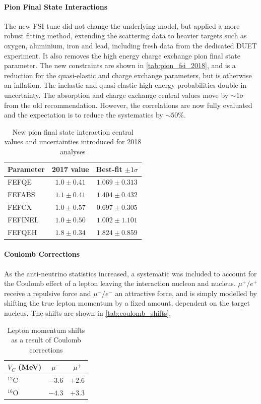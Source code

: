 \paragraph{Pion Final State Interactions}
The new FSI tune\cite{thesis_elder} did not change the underlying model, but applied a more robust fitting method, extending the scattering data to heavier targets such as oxygen, aluminium, iron and lead, including fresh data from the dedicated DUET experiment\cite{duet}. It also removes the high energy charge exchange pion final state parameter. The new constraints are shown in \autoref{tab:pion_fsi_2018}, and is a reduction for the quasi-elastic and charge exchange parameters, but is otherwise an inflation. The inelastic and quasi-elastic high energy probabilities double in uncertainty. The absorption and charge exchange central values move by $\sim1\sigma$ from the old recommendation. However, the correlations are now fully evaluated and the expectation is to reduce the systematics by $\sim50\%$.
\begin{table}[h]
	\begin{tabular}{l | c c}
		\hline
		\hline
		Parameter & 2017 value & Best-fit $\pm1\sigma$ \\
		\hline
		FEFQE & $1.0\pm0.41$ & $1.069\pm0.313$ \\
		FEFABS & $1.1\pm0.41$ & $1.404\pm0.432$ \\
		FEFCX & $1.0\pm0.57$ & $0.697\pm0.305$ \\
		FEFINEL & $1.0\pm0.50$ & $1.002\pm1.101$ \\
		FEFQEH & $1.8\pm0.34$ & $1.824\pm0.859$ \\
		\hline
		\hline
	\end{tabular}
\caption{New pion final state interaction central values and uncertainties introduced for 2018 analyses}
\label{tab:pion_fsi_2018}
\end{table}

\paragraph{Coulomb Corrections}
As the anti-neutrino statistics increased, a systematic was included to account for the Coulomb effect of a lepton leaving the interaction nucleon and nucleus. $\mu^+/e^+$ receive a repulsive force and $\mu^-/e^-$ an attractive force, and is simply modelled by shifting the true lepton momentum by a fixed amount, dependent on the target nucleus\cite{coulomb1, coulomb2}. The shifts are shown in \autoref{tab:coulomb_shifts}.
\begin{table}[h]
	\begin{tabular}{l | c c}
		\hline
		\hline
		$V_C$ (MeV) & $\mu^-$ & $\mu^+$ \\
		\hline
		$^{12}\text{C}$ & $-3.6$ & $+2.6$ \\
		$^{16}\text{O}$ & $-4.3$ & $+3.3$ \\
		\hline
		\hline
	\end{tabular}
		\caption{Lepton momentum shifts as a result of Coulomb corrections}
		\label{tab:coulomb_shifts}
\end{table}

